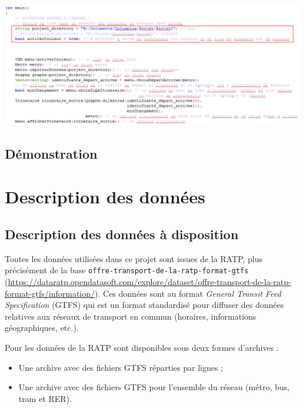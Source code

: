 \documentclass[,french]{article}
\providecommand{\tightlist}{%
  \setlength{\itemsep}{0pt}\setlength{\parskip}{0pt}}
\begin{document}
\includegraphics{img/main.png}

\hypertarget{duxe9monstration}{%
\subsection{Démonstration}\label{duxe9monstration}}

\hypertarget{sec:def_donnees}{%
\section{Description des données}\label{sec:def_donnees}}

\hypertarget{description-des-donnuxe9es-uxe0-disposition}{%
\subsection{Description des données à
disposition}\label{description-des-donnuxe9es-uxe0-disposition}}

Toutes les données utilisées dans ce projet sont issues de la RATP, plus
précisément de la base \texttt{offre-transport-de-la-ratp-format-gtfs}
(\url{https://dataratp.opendatasoft.com/explore/dataset/offre-transport-de-la-ratp-format-gtfs/information/}).
Ces données sont au format \emph{General Transit Feed Specification}
(GTFS) qui est un format standardisé pour diffuser des données relatives
aux réseaux de transport en commun (horaires, informations
géographiques, etc.).

Pour les données de la RATP sont disponibles sous deux formes d'archives
:

\begin{itemize}
\tightlist
\item
  Une archive avec des fichiers GTFS réparties par lignes ;\\
\item
  Une archive avec des fichiers GTFS pour l'ensemble du réseau (métro,
  bus, tram et RER).
\end{itemize}
\end{document}
